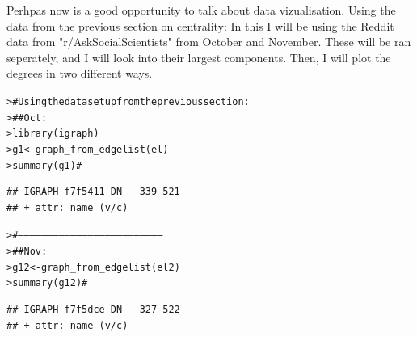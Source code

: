 \documentclass[12pt]{article}\usepackage[]{graphicx}\usepackage[]{color}
\makeatletter
\newcommand{\hlcom}[1]{\textcolor[rgb]{0.404,0.408,0.42}{#1}}%
\newcommand{\hlstd}[1]{\textcolor[rgb]{0.882,0.878,0.898}{#1}}%
\newcommand{\hlkwb}[1]{\textcolor[rgb]{0.902,0.675,0.196}{#1}}%
\newcommand{\hlkwd}[1]{\textcolor[rgb]{0.733,0.388,0.812}{#1}}%
\newenvironment{kframe}{%
 \def\at@end@of@kframe{}%
 \ifinner\ifhmode%
  \def\at@end@of@kframe{\end{minipage}}%
  \begin{minipage}{\columnwidth}%
 \fi\fi%
 \def\FrameCommand##1{\hskip\@totalleftmargin \hskip-\fboxsep
 \colorbox{shadecolor}{##1}\hskip-\fboxsep
     \hskip-\linewidth \hskip-\@totalleftmargin \hskip\columnwidth}%
 \MakeFramed {\advance\hsize-\width
   \@totalleftmargin\z@ \linewidth\hsize
   \@setminipage}}%
 {\par\unskip\endMakeFramed%
 \at@end@of@kframe}
\newenvironment{knitrout}{}{} %
\makeatother
\begin{document}
\begin{flushleft}
Perhpas now is a good opportunity to talk about data vizualisation. Using the data from the previous section on centrality:
In this I will be using the Reddit data from "r/AskSocialScientists" from October and November. These will be ran seperately, and I will look into their largest components. Then, I will plot the degrees in two different ways.

\begin{knitrout}
\color{fgcolor}\begin{kframe}
\begin{alltt}
\hlstd{> }\hlcom{# Using the data set up from the previous section:}
\hlstd{> }\hlcom{##    Oct:}
\hlstd{> }\hlkwd{library}\hlstd{(igraph)}
\hlstd{> }\hlstd{g1} \hlkwb{<-} \hlkwd{graph_from_edgelist}\hlstd{(el)}
\hlstd{> }\hlkwd{summary}\hlstd{(g1)} \hlcom{#}
\end{alltt}
\begin{verbatim}
## IGRAPH f7f5411 DN-- 339 521 -- 
## + attr: name (v/c)
\end{verbatim}
\begin{alltt}
\hlstd{> }\hlcom{#---------------------------------------------------------------------------}
\hlstd{> }\hlcom{##   Nov:}
\hlstd{> }\hlstd{g12} \hlkwb{<-} \hlkwd{graph_from_edgelist}\hlstd{(el2)}
\hlstd{> }\hlkwd{summary}\hlstd{(g12)} \hlcom{#}
\end{alltt}
\begin{verbatim}
## IGRAPH f7f5dce DN-- 327 522 -- 
## + attr: name (v/c)
\end{verbatim}
\end{kframe}
\end{knitrout}


\end{flushleft}
\end{document}
